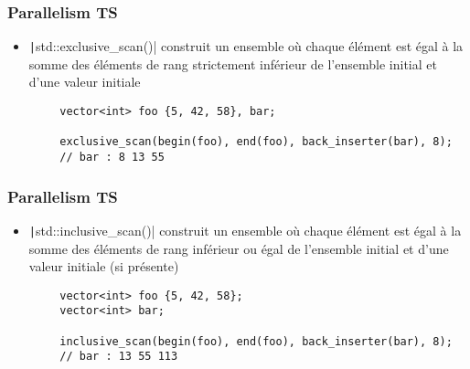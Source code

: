 \documentclass[C++.tex]{subfiles}
\begin{document}
\begin{frame}[fragile]
	\frametitle{Parallelism TS}
	\begin{itemize}
		\item \texttt|std::exclusive_scan()| construit un ensemble où chaque élément est égal à la somme des éléments de rang strictement inférieur de l'ensemble initial et d'une valeur initiale
	\end{itemize}

	\begin{verbatim}
		vector<int> foo {5, 42, 58}, bar;

		exclusive_scan(begin(foo), end(foo), back_inserter(bar), 8);
		// bar : 8 13 55
	\end{verbatim}

\end{frame}

\begin{frame}[fragile]
	\frametitle{Parallelism TS}
	\begin{itemize}
		\item \texttt|std::inclusive_scan()| construit un ensemble où chaque élément est égal à la somme des éléments de rang inférieur ou égal de l'ensemble initial et d'une valeur initiale (si présente)
	\end{itemize}

	\begin{verbatim}
		vector<int> foo {5, 42, 58};
		vector<int> bar;

		inclusive_scan(begin(foo), end(foo), back_inserter(bar), 8);
		// bar : 13 55 113
	\end{verbatim}


\end{frame}
\end{document}
